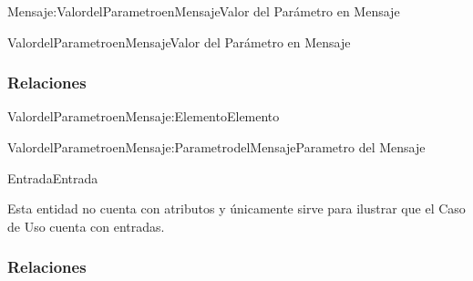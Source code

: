 \begin{BusinessFact}{Mensaje:ValordelParametroenMensaje}{Valor del Parámetro en Mensaje}
\end{BusinessFact}


\begin{BusinessEntity}{ValordelParametroenMensaje}{Valor del Parámetro en Mensaje}
\end{BusinessEntity}

\subsubsection{Relaciones}

\begin{BusinessFact}{ValordelParametroenMensaje:Elemento}{Elemento}
\end{BusinessFact}

\begin{BusinessFact}{ValordelParametroenMensaje:ParametrodelMensaje}{Parametro del Mensaje}
\end{BusinessFact}


\begin{BusinessEntity}{Entrada}{Entrada}
	\item Esta entidad no cuenta con atributos y únicamente sirve para ilustrar que el Caso de Uso cuenta con entradas.
\end{BusinessEntity}

\subsubsection{Relaciones}

